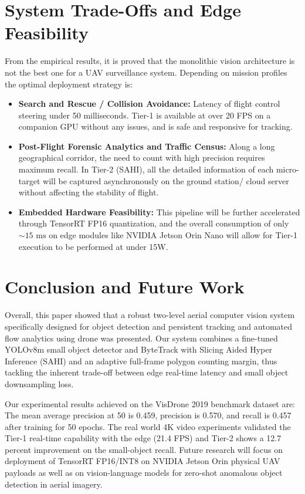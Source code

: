 \documentclass[conference]{IEEEtran}
\begin{document}
\section{System Trade-Offs and Edge Feasibility}
From the empirical results, it is proved that the monolithic vision architecture is not the best one for a UAV surveillance system. Depending on mission profiles the optimal deployment strategy is:
\begin{itemize}
    \item \textbf{Search and Rescue / Collision Avoidance:} Latency of flight control steering under 50 milliseconds. Tier-1 is available at over 20 FPS on a companion GPU without any issues, and is safe and responsive for tracking.
    \item \textbf{Post-Flight Forensic Analytics and Traffic Census:} Along a long geographical corridor, the need to count with high precision requires maximum recall. In Tier-2 (SAHI), all the detailed information of each micro-target will be captured asynchronously on the ground station/ cloud server without affecting the stability of flight.
    \item \textbf{Embedded Hardware Feasibility:} This pipeline will be further accelerated through TensorRT FP16 quantization, and the overall consumption of only $\sim 15\text{ ms}$ on edge modules like NVIDIA Jetson Orin Nano will allow for Tier-1 execution to be performed at under 15W.
\end{itemize}

\section{Conclusion and Future Work}
Overall, this paper showed that a robust two-level aerial computer vision system specifically designed for object detection and persistent tracking and automated flow analytics using drone was presented. Our system combines a fine-tuned YOLOv8m small object detector and ByteTrack with Slicing Aided Hyper Inference (SAHI) and an adaptive full-frame polygon counting margin, thus tackling the inherent trade-off between edge real-time latency and small object downsampling loss. 

Our experimental results achieved on the VisDrone 2019 benchmark dataset are: The mean average precision at 50 is 0.459, precision is 0.570, and recall is 0.457 after training for 50 epochs. The real world 4K video experiments validated the Tier-1 real-time capability with the edge (21.4 FPS) and Tier-2 shows a 12.7 percent improvement on the small-object recall. Future research will focus on deployment of TensorRT FP16/INT8 on NVIDIA Jetson Orin physical UAV payloads as well as on vision-language models for zero-shot anomalous object detection in aerial imagery.
\end{document}
